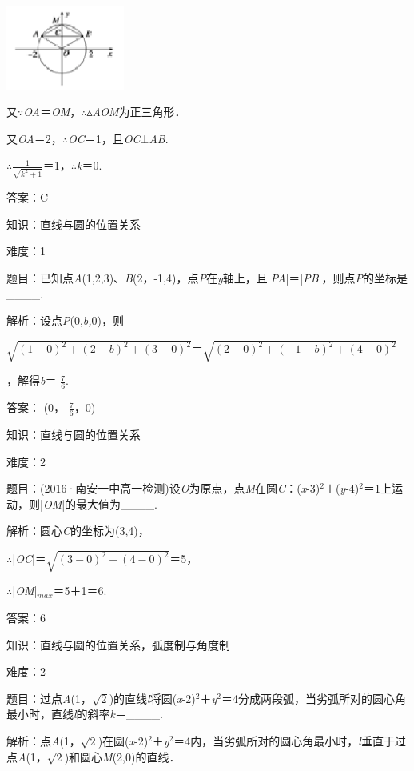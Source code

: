 \documentclass{article} %
\begin{document}
\includegraphics*[width=1.53in, height=1.08in, keepaspectratio=false]{image313}

又$\mathrm{\because}$\textit{OA}＝\textit{OM}，$\mathrm{\therefore}$$\mathrm{\vartriangle}$\textit{AOM}为正三角形．

又\textit{OA}＝2，$\mathrm{\therefore}$\textit{OC}＝1，且\textit{OC}$\mathrm{\bot}$\textit{AB}.

$\mathrm{\therefore}$$\frac{1}{\sqrt{k^2+1}}$＝1，$\mathrm{\therefore}$\textit{k}＝0.

答案：C

知识：直线与圆的位置关系

难度：1

题目：已知点\textit{A}(1,2,3)、\textit{B}(2，-1,4)，点\textit{P}在\textit{y}轴上，且|\textit{PA}|＝|\textit{PB}|，则点\textit{P}的坐标是\_\_\_\_.

解析：设点\textit{P}(0,\textit{b,}0)，则

$\sqrt{(1-0)^2+(2-b)^2+(3-0)^2}$＝$\sqrt{(2-0)^2+(-1-b)^2+(4-0)^2}$

，解得\textit{b}＝-$\frac{7}{6}$.

答案： (0，-$\frac{7}{6}$，0)

知识：直线与圆的位置关系

难度：2

题目：(2016·南安一中高一检测)设\textit{O}为原点，点\textit{M}在圆\textit{C}：(\textit{x}-3)${}^{2}$＋(\textit{y}-4)${}^{2}$＝1上运动，则|\textit{OM}|的最大值为\_\_\_\_.

解析：圆心\textit{C}的坐标为(3,4)，

$\mathrm{\therefore}$|\textit{OC}|＝$\sqrt{(3-0)^2+(4-0)^2}$＝5，

$\mathrm{\therefore}$|\textit{OM}|${}_{max}$＝5＋1＝6.

答案：6

知识：直线与圆的位置关系，弧度制与角度制

难度：2

题目：过点\textit{A}(1，$\sqrt{2}$)的直线\textit{l}将圆(\textit{x}-2)${}^{2}$＋\textit{y}${}^{2}$＝4分成两段弧，当劣弧所对的圆心角最小时，直线\textit{l}的斜率\textit{k}＝\_\_\_\_.

解析：点\textit{A}(1，$\sqrt{2}$)在圆(\textit{x}-2)${}^{2}$＋\textit{y}${}^{2}$＝4内，当劣弧所对的圆心角最小时，\textit{l}垂直于过点\textit{A}(1，$\sqrt{2}$)和圆心\textit{M}(2,0)的直线．
\end{document}
